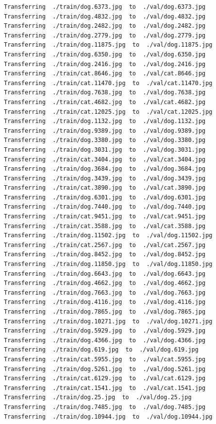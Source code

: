 \documentclass[]{book}
\theoremstyle{definition}
\theoremstyle{definition}
\theoremstyle{definition}
\theoremstyle{remark}
\begin{document}
\begin{verbatim}
Transferring  ./train/dog.6373.jpg  to  ./val/dog.6373.jpg
Transferring  ./train/dog.4832.jpg  to  ./val/dog.4832.jpg
Transferring  ./train/dog.2482.jpg  to  ./val/dog.2482.jpg
Transferring  ./train/dog.2779.jpg  to  ./val/dog.2779.jpg
Transferring  ./train/dog.11875.jpg  to  ./val/dog.11875.jpg
Transferring  ./train/dog.6350.jpg  to  ./val/dog.6350.jpg
Transferring  ./train/dog.2416.jpg  to  ./val/dog.2416.jpg
Transferring  ./train/cat.8646.jpg  to  ./val/cat.8646.jpg
Transferring  ./train/cat.11470.jpg  to  ./val/cat.11470.jpg
Transferring  ./train/dog.7638.jpg  to  ./val/dog.7638.jpg
Transferring  ./train/cat.4682.jpg  to  ./val/cat.4682.jpg
Transferring  ./train/cat.12025.jpg  to  ./val/cat.12025.jpg
Transferring  ./train/dog.1132.jpg  to  ./val/dog.1132.jpg
Transferring  ./train/dog.9389.jpg  to  ./val/dog.9389.jpg
Transferring  ./train/dog.3380.jpg  to  ./val/dog.3380.jpg
Transferring  ./train/dog.3031.jpg  to  ./val/dog.3031.jpg
Transferring  ./train/cat.3404.jpg  to  ./val/cat.3404.jpg
Transferring  ./train/dog.3684.jpg  to  ./val/dog.3684.jpg
Transferring  ./train/dog.3439.jpg  to  ./val/dog.3439.jpg
Transferring  ./train/cat.3890.jpg  to  ./val/cat.3890.jpg
Transferring  ./train/dog.6301.jpg  to  ./val/dog.6301.jpg
Transferring  ./train/dog.7440.jpg  to  ./val/dog.7440.jpg
Transferring  ./train/cat.9451.jpg  to  ./val/cat.9451.jpg
Transferring  ./train/cat.3588.jpg  to  ./val/cat.3588.jpg
Transferring  ./train/dog.11502.jpg  to  ./val/dog.11502.jpg
Transferring  ./train/cat.2567.jpg  to  ./val/cat.2567.jpg
Transferring  ./train/dog.8452.jpg  to  ./val/dog.8452.jpg
Transferring  ./train/dog.11850.jpg  to  ./val/dog.11850.jpg
Transferring  ./train/dog.6643.jpg  to  ./val/dog.6643.jpg
Transferring  ./train/dog.4662.jpg  to  ./val/dog.4662.jpg
Transferring  ./train/dog.7663.jpg  to  ./val/dog.7663.jpg
Transferring  ./train/dog.4116.jpg  to  ./val/dog.4116.jpg
Transferring  ./train/dog.7865.jpg  to  ./val/dog.7865.jpg
Transferring  ./train/dog.10271.jpg  to  ./val/dog.10271.jpg
Transferring  ./train/dog.5929.jpg  to  ./val/dog.5929.jpg
Transferring  ./train/dog.4366.jpg  to  ./val/dog.4366.jpg
Transferring  ./train/dog.619.jpg  to  ./val/dog.619.jpg
Transferring  ./train/cat.5955.jpg  to  ./val/cat.5955.jpg
Transferring  ./train/dog.5261.jpg  to  ./val/dog.5261.jpg
Transferring  ./train/cat.6129.jpg  to  ./val/cat.6129.jpg
Transferring  ./train/cat.1541.jpg  to  ./val/cat.1541.jpg
Transferring  ./train/dog.25.jpg  to  ./val/dog.25.jpg
Transferring  ./train/dog.7485.jpg  to  ./val/dog.7485.jpg
Transferring  ./train/dog.10944.jpg  to  ./val/dog.10944.jpg

\end{verbatim}
\end{document}
